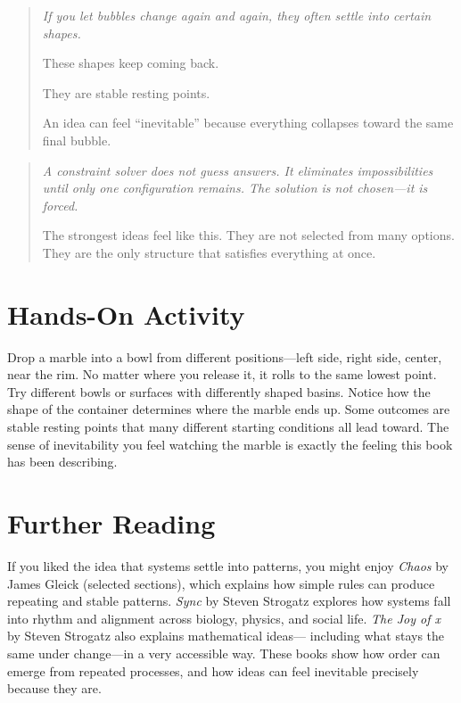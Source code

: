 \documentclass[11pt]{book}
\theoremstyle{definition}
\theoremstyle{remark}
\newenvironment{literaryaside}
  {\begin{quote}\small\itshape}
  {\end{quote}}
\newenvironment{spherepopjunior}
  {\begin{quote}\small\itshape}
  {\end{quote}}
\begin{document}
\begin{spherepopjunior}
If you let bubbles change again and again, they often settle into
certain shapes.

These shapes keep coming back.

They are stable resting points.

An idea can feel ``inevitable'' because everything collapses toward
the same final bubble.
\end{spherepopjunior}

\begin{literaryaside}
A constraint solver does not guess answers. It eliminates impossibilities
until only one configuration remains. The solution is not chosen---it
is forced.

The strongest ideas feel like this. They are not selected from many
options. They are the only structure that satisfies everything at once.
\end{literaryaside}

\section*{Hands-On Activity}

Drop a marble into a bowl from different positions---left side, right
side, center, near the rim. No matter where you release it, it rolls
to the same lowest point. Try different bowls or surfaces with
differently shaped basins. Notice how the shape of the container
determines where the marble ends up. Some outcomes are stable resting
points that many different starting conditions all lead toward. The
sense of inevitability you feel watching the marble is exactly the
feeling this book has been describing.

\section*{Further Reading}

If you liked the idea that systems settle into patterns, you might
enjoy \textit{Chaos} by James Gleick (selected sections), which
explains how simple rules can produce repeating and stable patterns.
\textit{Sync} by Steven Strogatz explores how systems fall into rhythm
and alignment across biology, physics, and social life. \textit{The
Joy of x} by Steven Strogatz also explains mathematical ideas---
including what stays the same under change---in a very accessible way.
These books show how order can emerge from repeated processes, and how
ideas can feel inevitable precisely because they are.
\end{document}

